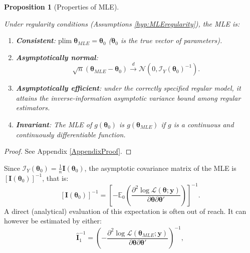 \documentclass[
  11pt,
]{book}
\providecommand{\tightlist}{%
  \setlength{\itemsep}{0pt}\setlength{\parskip}{0pt}}
\newtheorem{proposition}{Proposition}[chapter]
\theoremstyle{definition}
\theoremstyle{definition}
\theoremstyle{definition}
\theoremstyle{definition}
\theoremstyle{remark}
\begin{document}
\begin{proposition}[Properties of MLE]
\protect\hypertarget{prp:MLEproperties}{}\label{prp:MLEproperties}

Under regularity conditions (Assumptions \ref{hyp:MLEregularity}), the MLE is:

\begin{enumerate}
\def\labelenumi{\alph{enumi}.}
\tightlist
\item
  \textbf{Consistent}: \(\mbox{plim}\;  \boldsymbol\theta_{MLE} = {\boldsymbol\theta}_0\) (\({\boldsymbol\theta}_0\) is the true vector of parameters).
\item
  \textbf{Asymptotically normal}:
  \begin{equation}
  \boxed{\sqrt{n}(\boldsymbol\theta_{MLE} - \boldsymbol\theta_{0}) \overset{d}{\rightarrow} \mathcal{N}(0,\mathcal{I}_Y(\boldsymbol\theta_0)^{-1}).} \label{eq:normMLE}
  \end{equation}
\item
  \textbf{Asymptotically efficient}: under the correctly specified regular model, it attains the inverse-information asymptotic variance bound among regular estimators.
\item
  \textbf{Invariant}: The MLE of \(g(\boldsymbol\theta_0)\) is \(g(\boldsymbol\theta_{MLE})\) if \(g\) is a continuous and continuously differentiable function.
\end{enumerate}

\end{proposition}

\begin{proof}
See Appendix \ref{AppendixProof}.
\end{proof}

Since \(\mathcal{I}_Y(\boldsymbol\theta_0)=\frac{1}{n}\mathbf{I}(\boldsymbol\theta_0)\), the asymptotic covariance matrix of the MLE is \([\mathbf{I}(\boldsymbol\theta_0)]^{-1}\), that is:
\[
[\mathbf{I}(\boldsymbol\theta_0)]^{-1} = \left[- \mathbb{E}_0 \left( \frac{\partial^2 \log \mathcal{L}(\boldsymbol\theta;\mathbf{y})}{\partial \boldsymbol\theta \partial \boldsymbol\theta'}\right) \right]^{-1}.
\]
A direct (analytical) evaluation of this expectation is often out of reach. It can however be estimated by either:
\begin{equation}
\hat{\mathbf{I}}_1^{-1} =  \left( - \frac{\partial^2 \log \mathcal{L}({\boldsymbol\theta_{MLE}};\mathbf{y})}{\partial {\boldsymbol\theta} \partial {\boldsymbol\theta}'}\right)^{-1}, \label{eq:III1}
\end{equation}
\end{document}
